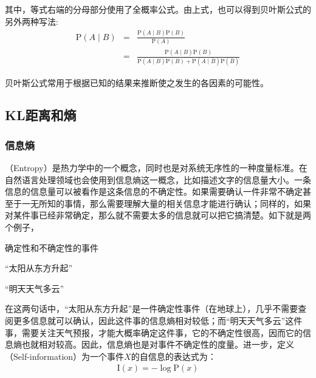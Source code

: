 \noindent 其中，等式右端的分母部分使用了全概率公式。由上式，也可以得到贝叶斯公式的另外两种写法:
\begin{eqnarray}
\textrm{P}(A \mid B) & = & \frac { \textrm{P}(A \mid B)\textrm{P}(B) }  {\textrm{P}(A)} \nonumber \\
                     & = & \frac { \textrm{P}(A \mid B)\textrm{P}(B) }  {\textrm{P}(A \mid B)\textrm{P}(B)+\textrm{P}(A \mid \bar{B}) \textrm{P}(\bar{B})}
\label{eq:2-12}
\end{eqnarray}

\parinterval 贝叶斯公式常用于根据已知的结果来推断使之发生的各因素的可能性。


\subsection{KL距离和熵}


\subsubsection{信息熵}

（Entropy）是热力学中的一个概念，同时也是对系统无序性的一种度量标准。在自然语言处理领域也会使用到信息熵这一概念，比如描述文字的信息量大小。一条信息的信息量可以被看作是这条信息的不确定性。如果需要确认一件非常不确定甚至于一无所知的事情，那么需要理解大量的相关信息才能进行确认；同样的，如果对某件事已经非常确定，那么就不需要太多的信息就可以把它搞清楚。如下就是两个例子，

\begin{example}
确定性和不确定性的事件

\qquad\qquad\quad``太阳从东方升起''

\qquad\qquad\quad``明天天气多云''
\label{eg:2-1}
\end{example}

\parinterval 在这两句话中，``太阳从东方升起''是一件确定性事件（在地球上），几乎不需要查阅更多信息就可以确认，因此这件事的信息熵相对较低；而``明天天气多云''这件事，需要关注天气预报，才能大概率确定这件事，它的不确定性很高，因而它的信息熵也就相对较高。因此，信息熵也是对事件不确定性的度量。进一步，定义{\small{}}（Self-information）为一个事件$X$的自信息的表达式为：
\begin{eqnarray}
\textrm{I}(x)=-\log\textrm{P}(x)
\label{eq:2-13}
\end{eqnarray}

